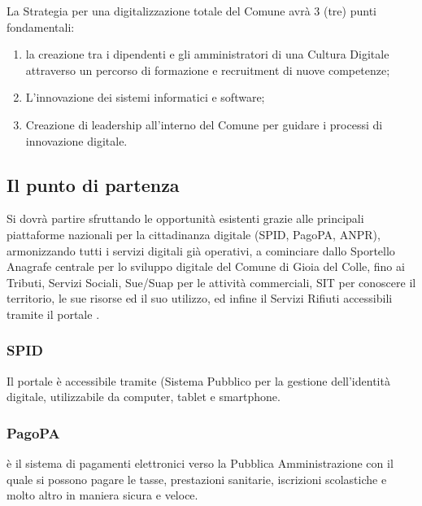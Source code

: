 \documentclass[a4paper,14pt,italian]{sphinxmanual}
\begin{document}
La Strategia per una digitalizzazione totale del Comune avrà 3 (tre) punti fondamentali:
\begin{enumerate}
\def\theenumi{\arabic{enumi}}
\def\labelenumi{\theenumi .}
\makeatletter\def\p@enumii{\p@enumi \theenumi .}\makeatother
\item {} 
la creazione tra i dipendenti e gli amministratori di una Cultura Digitale attraverso un percorso di formazione e recruitment di nuove competenze;

\item {} 
L’innovazione dei sistemi informatici e software;

\item {} 
Creazione di leadership all’interno del Comune per guidare i processi di innovazione digitale.

\end{enumerate}


\subsection{Il punto di partenza}
\label{\detokenize{digitale:il-punto-di-partenza}}
Si dovrà partire sfruttando le opportunità esistenti grazie alle principali piattaforme nazionali per la cittadinanza digitale (SPID, PagoPA, ANPR), armonizzando tutti i servizi digitali già operativi, a cominciare dallo Sportello Anagrafe centrale per lo sviluppo digitale del Comune di Gioia del Colle, fino ai Tributi, Servizi Sociali, Sue/Suap per le attività commerciali, SIT per conoscere il territorio, le sue risorse ed il suo utilizzo, ed infine il Servizi Rifiuti accessibili tramite il portale .


\subsubsection{SPID}
\label{\detokenize{digitale:spid}}
Il portale  è accessibile tramite  (Sistema Pubblico per la gestione dell’identità digitale, utilizzabile da computer, tablet e smartphone.


\subsubsection{PagoPA}
\label{\detokenize{digitale:pagopa}}
 è il sistema di pagamenti elettronici verso la Pubblica Amministrazione con il quale si possono pagare le tasse, prestazioni sanitarie, iscrizioni scolastiche e molto altro in maniera sicura e veloce.
\end{document}
